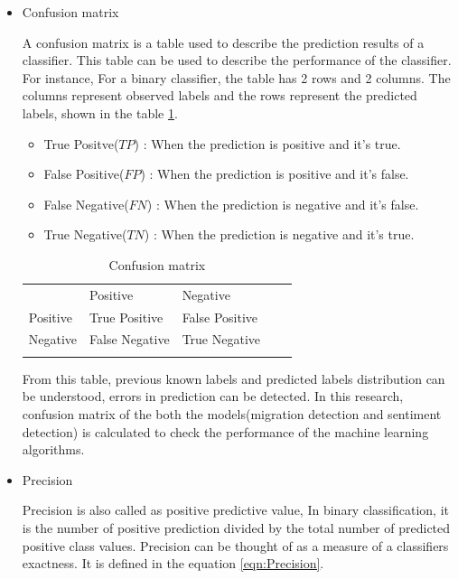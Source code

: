 \begin{itemize}
 \item Confusion matrix
 
 A confusion matrix is a table used to describe the prediction results of a classifier. This table can be used to describe the performance of the classifier. For instance, For a binary classifier, the table has 2 rows and 2 columns. The columns represent observed labels and the rows represent the predicted labels, shown in the table \ref{tab:confusionmatrix}.
 
 \begin{itemize}
     \item True Positve($TP$) : When the prediction is positive and it’s true.
     \item False Positive($FP$) : When the prediction is positive and it’s false.
     \item False Negative($FN$) : When the prediction is negative and it’s false.
     \item True Negative($TN$) : When the prediction is negative and it’s true.
 \end{itemize}
 
\begin{table}[]
\centering
\begin{tabular}{lllll}
\cline{1-3}
\multicolumn{1}{|l|}{}   & \multicolumn{1}{l|}{Positive} & \multicolumn{1}{l|}{Negative}  &  &  \\ \cline{1-3}
\multicolumn{1}{|l|}{Positive} & \multicolumn{1}{l|}{True Positive}  & \multicolumn{1}{l|}{False Positive} &  &  \\ \cline{1-3}
\multicolumn{1}{|l|}{Negative}   & \multicolumn{1}{l|}{False Negative}  & \multicolumn{1}{l|}{True Negative}  &  &  \\ \cline{1-3}
                            &                           &                           &  & 
\end{tabular}
\caption{Confusion matrix}
\label{tab:confusionmatrix}
\end{table}
  From this table, previous known labels and predicted labels distribution can be understood, errors in prediction can be detected. In this research, confusion matrix of the both the models(migration detection and sentiment detection) is calculated to check the performance of the machine learning algorithms.
 
    \item Precision
    
    Precision is also called as positive predictive value, In binary classification, it is the number of positive prediction divided by the total number of predicted positive class values. Precision can be thought of as a measure of a classifiers exactness. It is defined in the equation \ref{eqn:Precision}. 
    

\end{itemize}

